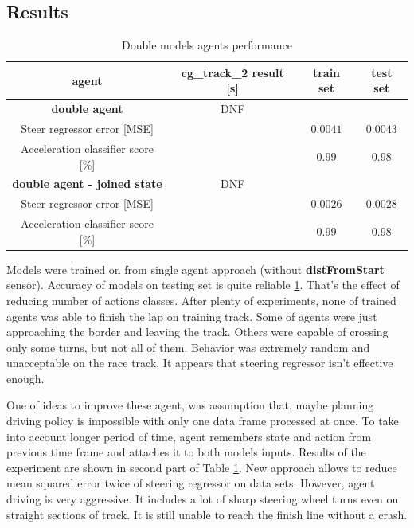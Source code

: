 \documentclass[declaration,shortabstract,english,inz]{iithesis}
\begin{document}
\subsection{Results}

\begin{table}[h]
    \centering
    \begin{tabular}{ |c|c|c|c|}
          \hline
          agent & cg\_track\_2 result [s] & train set & test set \\
          \hline
          \textbf{double agent} & DNF &   &  \\
          \hline
          Steer regressor error [MSE]&   & $0.0041$ & $0.0043$\\
          \hline
          Acceleration classifier score [\%]&  & $0.99$ & $0.98$ \\
          \hline
          \textbf{double agent - joined state} & DNF &   &  \\
          \hline
          Steer regressor error [MSE]&   & $0.0026$ & $0.0028$\\
          \hline
          Acceleration classifier score [\%]&  & $0.99$ & $0.98$ \\
          \hline
          
        \end{tabular}
        \caption{Double models agents performance}
        \label{tab:double_models_results}

\end{table}


Models were trained on from single agent approach (without \textbf{distFromStart} sensor).
Accuracy of models on testing set is quite reliable \ref{tab:double_models_results}.
That's the effect of reducing number of actions classes.
After plenty of experiments, none of trained agents was able to finish the lap on training track.
Some of agents were just approaching the border and leaving the track.
Others were capable of crossing only some turns, but not all of them.
Behavior was extremely random and unacceptable on the race track.
It appears that steering regressor isn't effective enough.


One of ideas to improve these agent, was assumption that, maybe planning driving policy is impossible with only one data frame processed at once.
To take into account longer period of time, agent remembers state and action from previous time frame and attaches it to both models inputs.
Results of the experiment are shown in second part of Table \ref{tab:double_models_results}.
New approach allows to reduce mean squared error twice of steering regressor on data sets.
However, agent driving is very aggressive.
It includes a lot of sharp steering wheel turns even on straight sections of track.
It is still unable to reach the finish line without a crash.
\end{document}
